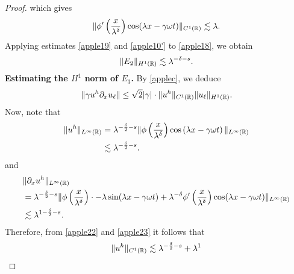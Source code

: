 \begin{proof}
which gives
\begin{equation}
	\begin{split}
		\|\phi'\left( \frac{x}{\lambda^\delta} \right) \cos(\lambda x - \gamma \omega t)
		\|_{C^1(\mathbb{R})} \lesssim \lambda.
		\label{apple19}
	\end{split}
\end{equation}
Applying estimates \eqref{apple19} and \eqref{apple10'} to \eqref{apple18}, we obtain
\begin{equation*}
	\begin{split}
	\label{apple20}
	\|E_2\|_{H^1(\mathbb{R})} \lesssim \lambda^{-\delta -s }.
\end{split}
\end{equation*}
%
%
%
%
{\bf Estimating the $H^1$ norm of $\hyperref[all_errors_together]{E_3}$.} 
By  \cref{applec}, we deduce
\begin{equation}
	\begin{split}
		\|\gamma u^h \partial_x u_\ell \| \le \sqrt{2} |\gamma| \cdot \|u^h\|_{C^1(\mathbb{R})}
		\|u_\ell\|_{H^1(\mathbb{R})}.
		\label{apple21}
	\end{split}
\end{equation}
Now, note that
\begin{equation}
	\begin{split}
		\|u^h\|_{L^\infty(\mathbb{R})} 
		& = \lambda^{-\frac{\delta}{2} -s } \|\phi\left( \frac{x}{\lambda^\delta}
		\right) \cos \left( \lambda x - \gamma \omega t \right) \|_{L^\infty(\mathbb{R})}
		\\
		& \lesssim \lambda^{-\frac{\delta}{2} -s }.
		\label{apple22}
	\end{split}
\end{equation}
and 
\begin{equation}
	\begin{split}
		& \|\partial_x u^h \|_{L^\infty(\mathbb{R})}
		\\
		& = \lambda^{-\frac{\delta}{2}-s} \|\phi\left(
		\frac{x}{\lambda^\delta}
		\right) \cdot -\lambda \sin(\lambda x - \gamma \omega t) + \lambda^{-\delta}
		\phi'\left( \frac{x}{\lambda^\delta}\right) \cos(\lambda x - \gamma \omega
		t) \|_{L^\infty(\mathbb{R})}
		\\
		& \lesssim \lambda^{1 - \frac{\delta}{2} -s }.
		\label{apple23}
	\end{split}
\end{equation}
Therefore, from \eqref{apple22} and \eqref{apple23} it follows that
\begin{equation}
	\begin{split}
		\|u^h\|_{C^1(\mathbb{R})} \lesssim \lambda^{-\frac{\delta}{2} -s } + \lambda^{1
}
\end{split}
\end{equation}
\end{proof}
